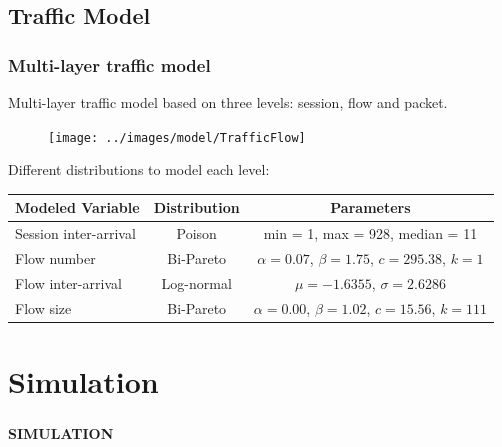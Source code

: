 \documentclass[9pt,handout,serif]{beamer}
\begin{document}
\subsection{Traffic Model}
\begin{frame}[c]
	\frametitle{Multi-layer traffic model}
	Multi-layer traffic model based on three levels: session, flow and packet.
	\begin{figure}
		\texttt{[image: ../images/model/TrafficFlow]}
	\end{figure}
	Different distributions to model each level:
	\begin{table}
	\begin{center}
		\begin{tabular}{ l | c | c }
			Modeled Variable & Distribution & Parameters \\ \hline
			Session inter-arrival & Poison & min = 1, max = 928, median = 11\\
			Flow number & Bi-Pareto & $\alpha = 0.07$, $\beta = 1.75$, $c = 295.38$, $k = 1$\\
			Flow inter-arrival & Log-normal & $\mu = -1.6355$, $\sigma = 2.6286$\\
			Flow size & Bi-Pareto & $\alpha = 0.00$, $\beta = 1.02$, $c = 15.56$, $k = 111$\\
		\end{tabular}
	\end{center}
\end{table}
\end{frame}

\section{Simulation}

\begin{frame}[c]
	\frametitle{}
	\begin{center}
		\textbf{\Huge{SIMULATION}}
	\end{center}
\end{frame}
\end{document}

